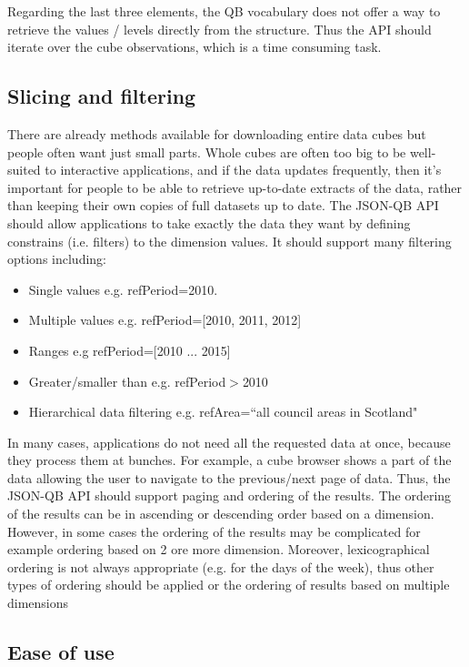 \documentclass{llncs}
\begin{document}
Regarding the last three elements, the QB vocabulary does not offer a way to retrieve the values / levels directly from the structure. Thus the API should iterate over the cube observations, which is a time consuming task.

\subsection{Slicing and filtering}\label{sec:slice}

There are already methods available for downloading entire data cubes but people often want just small parts.  Whole cubes are often too big to be well-suited to interactive applications, and if the data updates frequently,  then it's important for people to be able to retrieve up-to-date extracts of the data, rather than keeping their own copies of full datasets up to date. The JSON-QB API should allow applications to take exactly the data they want by defining constrains (i.e. filters) to the dimension values. It should support many filtering options including:
\begin{itemize}
\item Single values e.g. refPeriod=2010.
\item Multiple values e.g. refPeriod=[2010, 2011, 2012]
\item Ranges e.g refPeriod=[2010 ... 2015]
\item Greater/smaller than e.g. refPeriod$>$2010
\item Hierarchical data filtering e.g. refArea=``all council areas in Scotland"
\end{itemize}

In many cases, applications do not need all the requested data at once, because they process them at bunches. For example, a cube browser shows a part of the data allowing the user to navigate to the previous/next page of data. Thus, the JSON-QB API should support paging and ordering of the results. The ordering of the results can be in ascending or descending order based on a dimension. However, in some cases the ordering of the results may be complicated for example ordering based on 2 ore more dimension. Moreover, lexicographical ordering is not always appropriate (e.g. for the days of the week), thus other types of ordering should be applied or the ordering of results based on multiple dimensions

\subsection{Ease of use}
\end{document}
